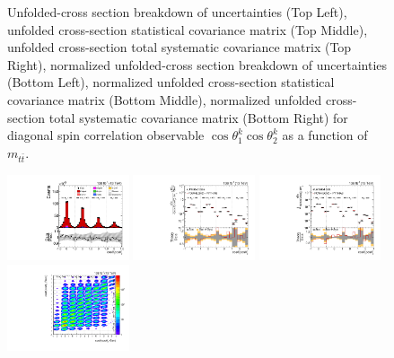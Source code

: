 \begin{figure}[htb]
\begin{center}
\caption{Unfolded-cross section breakdown of uncertainties (Top Left), unfolded cross-section statistical covariance matrix (Top Middle), unfolded cross-section total systematic covariance matrix (Top Right), normalized unfolded-cross section breakdown of uncertainties (Bottom Left), normalized unfolded cross-section statistical covariance matrix (Bottom Middle), normalized unfolded cross-section total systematic covariance matrix (Bottom Right) for diagonal spin correlation observable $\cos\theta_{1}^{k}\cos\theta_{2}^{k}$ as a function of $m_{t\bar{t}}$.}
\label{fig:c_kk_mttbar_uncertainties}
\end{center}
\end{figure}
\clearpage
\begin{figure}[htb]
\begin{center}
 \includegraphics[width=0.32\textwidth]{fig_fullRun2UL/controlplots/combined/Hyp_LLBarCrr_vs_TTBarMass.pdf}
 \includegraphics[width=0.32\textwidth]{fig_fullRun2UL/unfolding/combined/UnfoldedResults_c_rr_mttbar.pdf}
 \includegraphics[width=0.32\textwidth]{fig_fullRun2UL/unfolding/combined/UnfoldedResultsNorm_c_rr_mttbar.pdf} \\
 \includegraphics[width=0.32\textwidth]{fig_fullRun2UL/unfolding/combined/ResponseMatrix_c_rr_mttbar.pdf}

\end{center}
\end{figure}
